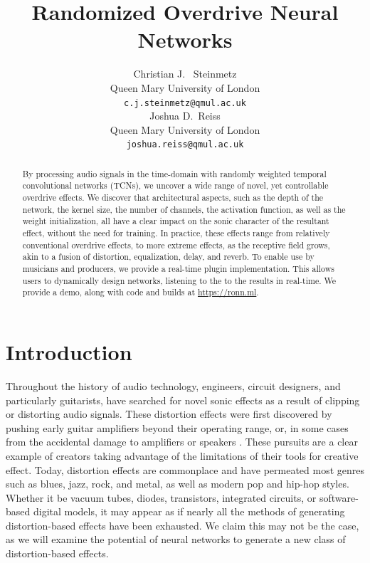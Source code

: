 \documentclass{article}
\title{Randomized Overdrive Neural Networks}
\author{%
  Christian J. ~Steinmetz \\
  Queen Mary University of London\\
  \texttt{c.j.steinmetz@qmul.ac.uk} \\
  \And
  Joshua D.~Reiss \\
  Queen Mary University of London \\
  \texttt{joshua.reiss@qmul.ac.uk} \\
}
\begin{document}
\maketitle

\begin{abstract}
By processing audio signals in the time-domain with randomly weighted temporal convolutional networks (TCNs),
we uncover a wide range of novel, yet controllable overdrive effects.
We discover that architectural aspects, such as the depth of the network, 
the kernel size, the number of channels, the activation function, as well as the weight initialization, 
all have a clear impact on the sonic character of the resultant effect, without the need for training. 
In practice, these effects range from relatively conventional overdrive effects,
to more extreme effects, as the receptive field grows, akin to a fusion of distortion, equalization, delay, and reverb.  
To enable use by musicians and producers, we provide a real-time plugin implementation.
This allows users to dynamically design networks, listening to the to the results in real-time.
We provide a demo, along with code and builds at \url{https://ronn.ml}.
\end{abstract} 



\section{Introduction}

Throughout the history of audio technology, engineers, circuit designers, 
and particularly guitarists, have searched for novel sonic effects as a result of clipping or distorting audio signals. 
These distortion effects were first discovered by pushing early guitar amplifiers beyond their operating range, 
or, in some cases from the accidental damage to amplifiers or speakers \cite{shepherd2003distortion}. 
These pursuits are a clear example of creators taking advantage of the limitations of their tools for creative effect.
Today, distortion effects are commonplace and have permeated most genres such as blues, jazz, rock, and metal, as well as modern pop and hip-hop styles.
Whether it be vacuum tubes, diodes, transistors, integrated circuits, or software-based digital models, 
it may appear as if nearly all the methods of generating distortion-based effects have been exhausted.
We claim this may not be the case, as we will examine the potential of neural networks to generate a new class of distortion-based effects. 
\end{document}
